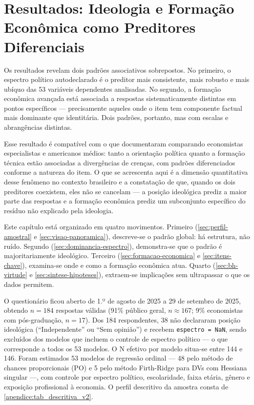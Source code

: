 
\chapter{Resultados: Ideologia e Formação Econômica como Preditores Diferenciais}
\label{capitulo_4}

Os resultados revelam dois padrões associativos sobrepostos. No primeiro, o espectro político autodeclarado é o preditor mais consistente, mais robusto e mais ubíquo das 53 variáveis dependentes analisadas. No segundo, a formação econômica avançada está associada a respostas sistematicamente distintas em pontos específicos — precisamente aqueles onde o item tem componente factual mais dominante que identitária. Dois padrões, portanto, mas com escalas e abrangências distintas.

Esse resultado é compatível com o que  documentaram comparando economistas especialistas e americanos médios: tanto a orientação política quanto a formação técnica estão associadas a divergências de crenças, com padrões diferenciados conforme a natureza do item. O que se acrescenta aqui é a dimensão quantitativa desse fenômeno no contexto brasileiro e a constatação de que, quando os dois preditores coexistem, eles não se cancelam — a posição ideológica prediz a maior parte das respostas e a formação econômica prediz um subconjunto específico do resíduo não explicado pela ideologia.

Este capítulo está organizado em quatro movimentos. Primeiro (\autoref{sec:perfil-amostral} e \autoref{sec:visao-panoramica}), descreve-se o padrão global: há estrutura, não ruído. Segundo (\autoref{sec:dominancia-espectro}), demonstra-se que o padrão é majoritariamente ideológico. Terceiro (\autoref{sec:formacao-economica} e \autoref{sec:itens-chave}), examina-se onde e como a formação econômica atua. Quarto (\autoref{sec:bh-virtude} e \autoref{sec:sintese-hipoteses}), extraem-se implicações sem ultrapassar o que os dados permitem.

O questionário ficou aberto de 1.º de agosto de 2025 a 29 de setembro de 2025, obtendo $n = 184$ respostas válidas (91\% público geral, $n \approx 167$; 9\% economistas com pós-graduação, $n = 17$). Dos 184 respondentes, 38 não declararam posição ideológica (``Independente'' ou ``Sem opinião'') e recebem \texttt{espectro = NaN}, sendo excluídos dos modelos que incluem o controle de espectro político — o que corresponde a todos os 53 modelos. O N efetivo por modelo situa-se entre 144 e 146. Foram estimados 53 modelos de regressão ordinal — 48 pelo método de chances proporcionais (PO) e 5 pelo método Firth-Ridge para DVs com Hessiana singular —, com controle por espectro político, escolaridade, faixa etária, gênero e exposição profissional à economia. O perfil descritivo da amostra consta de \autoref{apendice:tab_descritiva_v2}.

